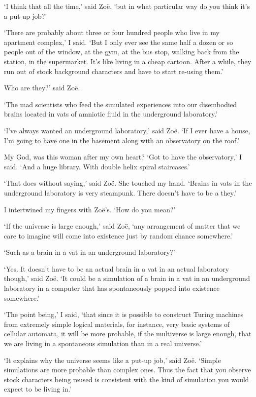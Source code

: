`I think that all the time,' said Zoë, `but in what particular
way do you think it's a put-up job?'

`There are probably about three or four hundred people who live in
my apartment complex,' I said. `But I only ever see the same half a
dozen or so people out of the window, at the gym, at the bus stop,
walking back from the station, in the supermarket. It's like living
in a cheap cartoon. After a while, they run out of stock background
characters and have to start re-using them.'

Who are {\twelveit they\/}?' said Zoë.

`The mad scientists who feed the simulated experiences into our
disembodied brains located in vats of amniotic fluid in the
underground laboratory.'

`I've always wanted an underground laboratory,' said Zoë. `If I
ever have a house, I'm going to have one in the basement along with
an observatory on the roof.'

My God, was this woman after my own heart? `Got to have the
observatory,' I said. `And a huge library. With double helix spiral
staircases.'

`That does without saying,' said Zoë. She touched my hand.
`Brains in vats in the underground laboratory is very steampunk.
There doesn't have to be a {\twelveit they}.'

I intertwined my fingers with Zoë's. `How do you mean?'

`If the universe is large enough,' said Zoë, `any arrangement of
matter that we care to imagine will come into existence just by
random chance somewhere.'

`Such as a brain in a vat in an underground laboratory?'

`Yes. It doesn't have to be an actual brain in a vat in an actual
laboratory though,' said Zoë. `It could be a simulation of a
brain in a vat in an underground laboratory in a computer that has
spontaneously popped into existence somewhere.'

`The point being,' I said, `that since it is possible to construct
Turing machines from extremely simple logical materials, for
instance, very basic systems of cellular automata, it will be more
probable, if the multiverse is large enough, that we are living in a
spontaneous simulation than in a real universe.'

`It explains why the universe seems like a put-up job,' said
Zoë. `Simple simulations are more probable than complex ones.
Thus the fact that you observe stock characters being reused is
consistent with the kind of simulation you would expect to be living
in.'

